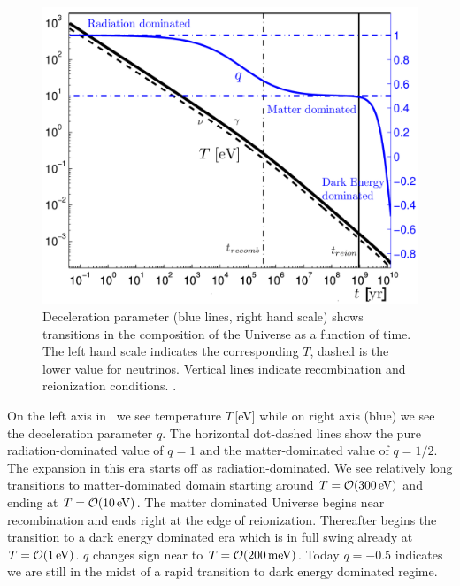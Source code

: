 \begin{figure}
\centerline{\includegraphics[width=0.90\linewidth]{plots/Tqtoday.png}}
\caption{Deceleration parameter (blue lines, right hand scale) shows transitions in the composition of the Universe as a function of time. The left hand scale indicates the corresponding $T$, dashed is the lower value for neutrinos. Vertical lines indicate recombination and reionization conditions. .
\label{fig:today} }
\end{figure}

On the left axis in~ we see temperature $T$\,[eV] while on right axis (blue) we see the deceleration parameter $q$. The horizontal dot-dashed lines show the pure radiation-dominated value of $q=1$ and the matter-dominated value of $q=1/2$. The expansion in this era starts off as radiation-dominated. We see relatively long transitions to matter-dominated domain starting around $T=\mathcal{O}(300\text{\,eV})$ and ending at $T=\mathcal{O}(10\text{\,eV})$. The matter dominated Universe begins near recombination and ends right at the edge of reionization. Thereafter begins the transition to a dark energy dominated era which is in full swing already at $T=\mathcal{O}(1\text{\,eV})$. $q$ changes sign near to $T=\mathcal{O}(200\text{\,meV})$. Today $q=-0.5$ indicates we are still in the midst of a rapid transition to dark energy dominated regime. 

